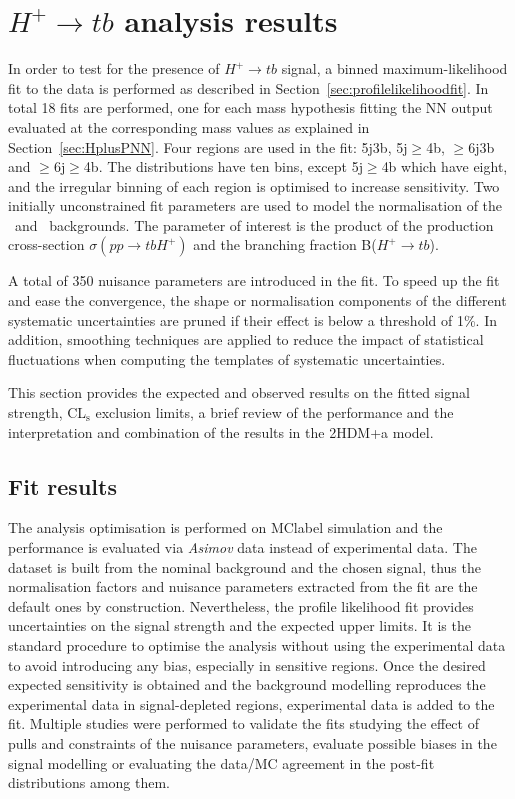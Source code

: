\chapter{$H^+\to tb$ analysis results}
\label{chapter:Htbresults}

In order to test for the presence of $H^+\to tb$ signal, a binned maximum-likelihood fit to the data is performed as described in Section~\ref{sec:profilelikelihoodfit}. In total 18 fits are performed, one for each mass hypothesis fitting the NN output evaluated at the corresponding mass values as explained in Section~\ref{sec:HplusPNN}. Four regions are used in the fit: 5j3b, 5j$\geq$4b, $\geq$6j3b and $\geq$6j$\geq$4b. The distributions have ten bins, except 5j$\geq$4b which have eight, and the irregular binning of each region is optimised to increase sensitivity. Two initially unconstrained fit parameters are used to model the normalisation of the \ttb\ and \ttc\ backgrounds. The parameter of interest is the product of the production cross-section $\sigma(pp\to tbH^+)$ and the branching fraction B($H^+\to tb$).

A total of 350 nuisance parameters are introduced in the fit. To speed up the fit and ease the convergence, the shape or normalisation components of the different systematic uncertainties are pruned if their effect is below a threshold of 1\%. In addition, smoothing techniques are applied to reduce the impact of statistical fluctuations when computing the templates of systematic uncertainties.

This section provides the expected and observed results on the fitted signal strength, CL$_{\text{s}}$ exclusion limits, a brief review of the performance and the interpretation and combination of the results in the 2HDM+a model.

\section{Fit results}

The analysis optimisation is performed on \acrshort{MClabel} simulation and the performance is evaluated via \textit{Asimov} data instead of experimental data. The dataset is built from the nominal background and the chosen signal, thus the normalisation factors and nuisance parameters extracted from the fit are the default ones by construction. Nevertheless, the profile likelihood fit provides uncertainties on the signal strength and the expected upper limits. It is the standard procedure to optimise the analysis without using the experimental data to avoid introducing any bias, especially in sensitive regions. Once the desired expected sensitivity is obtained and the background modelling reproduces the experimental data in signal-depleted regions, experimental data is added to the fit. Multiple studies were performed to validate the fits studying the effect of pulls and constraints of the nuisance parameters, evaluate possible biases in the signal modelling or evaluating the data/MC agreement in the post-fit distributions among them.


